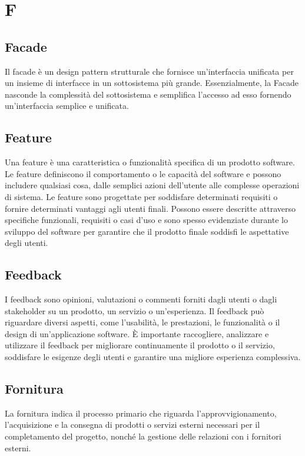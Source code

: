\section*{F} 
\subsection*{Facade} 
Il facade è un design pattern strutturale che fornisce un'interfaccia unificata per un insieme di interfacce in un sottosistema più grande. Essenzialmente, la Facade nasconde la complessità del sottosistema e semplifica l'accesso ad esso fornendo un'interfaccia semplice e unificata.
\subsection*{Feature} 
Una feature è una caratteristica o funzionalità specifica di un prodotto software. Le feature definiscono il comportamento o le capacità del software e possono includere qualsiasi cosa, dalle semplici azioni dell'utente alle complesse operazioni di sistema. Le feature sono progettate per soddisfare determinati requisiti o fornire determinati vantaggi agli utenti finali. Possono essere descritte attraverso specifiche funzionali, requisiti o casi d'uso e sono spesso evidenziate durante lo sviluppo del software per garantire che il prodotto finale soddisfi le aspettative degli utenti.
\subsection*{Feedback} 
I feedback sono opinioni, valutazioni o commenti forniti dagli utenti o dagli stakeholder su un prodotto, un servizio o un'esperienza. Il feedback può riguardare diversi aspetti, come l'usabilità, le prestazioni, le funzionalità o il design di un'applicazione software. È importante raccogliere, analizzare e utilizzare il feedback per migliorare continuamente il prodotto o il servizio, soddisfare le esigenze degli utenti e garantire una migliore esperienza complessiva.
\subsection*{Fornitura} 
La fornitura indica il processo primario che riguarda l'approvvigionamento, l'acquisizione e la consegna di prodotti o servizi esterni necessari per il completamento del progetto, nonché la gestione delle relazioni con i fornitori esterni.
